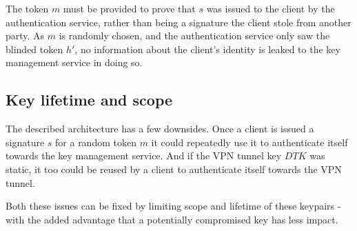\documentclass[a4paper]{scrreprt}
\newcommand{\var}[1]{\textit{#1}}
\begin{document}

\FloatBarrier

The token $m$ must be provided to prove that $s$ was issued to the client by
the authentication service, rather than being a signature the client stole from
another party. As $m$ is randomly chosen, and the authentication service only
saw the blinded token $h'$, no information about the client's identity is leaked
to the key management service in doing so.


\subsection{Key lifetime and scope}

The described architecture has a few downsides. Once a client is issued a
signature $s$ for a random token $m$ it could repeatedly use it to authenticate
itself towards the key management service. And if the VPN tunnel key $DTK$ was
static, it too could be reused by a client to authenticate itself towards the
VPN tunnel.

Both these issues can be fixed by limiting scope and lifetime of these keypairs
- with the added advantage that a potentially compromised key has less impact.
\end{document}
